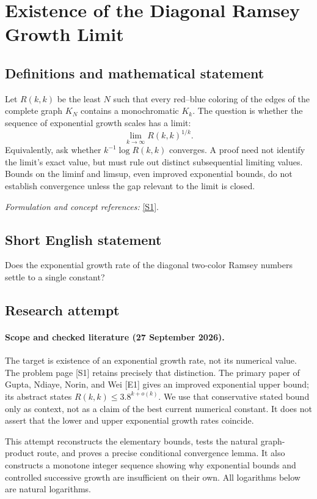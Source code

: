 \documentclass[11pt]{article}
\begin{document}
\section*{\texorpdfstring{Existence of the Diagonal Ramsey Growth Limit}{Existence of the Diagonal Ramsey Growth Limit}}\label{30005106}
\subsection{Definitions and mathematical statement}
Let $R(k,k)$ be the least $N$ such that every red--blue coloring of the edges of the complete graph $K_N$ contains a monochromatic $K_k$. The question is whether the sequence of exponential growth scales has a limit:
\[
 \lim_{k\to\infty}R(k,k)^{1/k}.
\]
Equivalently, ask whether $k^{-1}\log R(k,k)$ converges. A proof need not identify the limit's exact value, but must rule out distinct subsequential limiting values. Bounds on the liminf and limsup, even improved exponential bounds, do not establish convergence unless the gap relevant to the limit is closed.
\par\smallskip\textit{Formulation and concept references:} \href{https://www.erdosproblems.com/77}{[S1]}.

\subsection{Short English statement}
Does the exponential growth rate of the diagonal two-color Ramsey numbers settle to a single constant?
\subsection{Research attempt}
\paragraph{Scope and checked literature (27 September 2026).}
The target is existence of an exponential growth rate, not its numerical value. The problem page [S1] retains precisely that distinction. The primary paper of Gupta, Ndiaye, Norin, and Wei [E1] gives an improved exponential upper bound; its abstract states $R(k,k)\leq3.8^{k+o(k)}$. We use that conservative stated bound only as context, not as a claim of the best current numerical constant. It does not assert that the lower and upper exponential growth rates coincide.

This attempt reconstructs the elementary bounds, tests the natural graph-product route, and proves a precise conditional convergence lemma. It also constructs a monotone integer sequence showing why exponential bounds and controlled successive growth are insufficient on their own. All logarithms below are natural logarithms.
\end{document}
